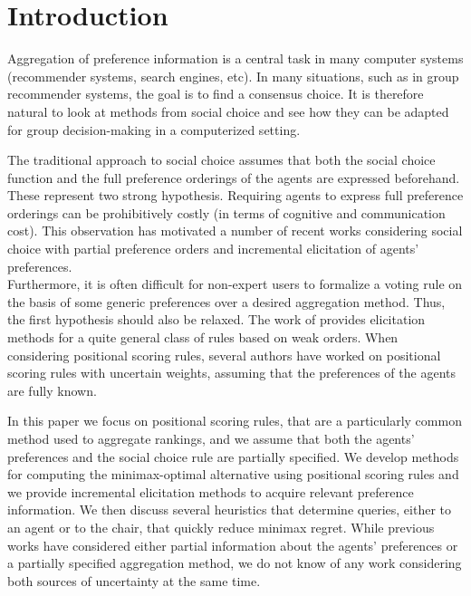 \section{Introduction}
Aggregation of preference information is a central task in many computer systems (recommender systems, search engines, etc).
In many situations, such as in group recommender systems, the goal is to find a consensus choice.
It is therefore natural to look at methods from social choice and see how they can be adapted for group decision-making in a computerized setting.

The traditional approach to social choice assumes that both the social choice function and the full preference orderings of the agents are expressed beforehand. These represent two strong hypothesis.
Requiring agents to express full preference orderings can be prohibitively costly (in terms of cognitive and communication cost).
This observation has motivated a number of recent works considering social choice with partial preference orders \citep{Xia2008, Pini2009, Konczak05} and incremental elicitation \citep{Kalech2011, Lu2011, Naamani-Dery2015} of agents’ preferences. \\ Furthermore, it is often difficult for non-expert users to formalize a voting rule on the basis of some generic preferences over a desired aggregation method. Thus, the first hypothesis should also be relaxed. 
The work of \citet{Cailloux2014} provides elicitation methods for a quite general class of rules based on weak orders.
When considering positional scoring rules, several authors \citep{Stein1994, Llamazares2013, Viappiani2018} have worked on positional scoring rules with uncertain weights, assuming that the preferences of the agents are fully known.

In this paper we focus on positional scoring rules, that are a particularly common method used to aggregate rankings, and we assume that both the agents’ preferences and the social choice rule are partially specified. We develop methods for computing the minimax-optimal
alternative using positional scoring rules and we provide incremental elicitation methods to acquire relevant preference information. We then discuss several heuristics that determine queries, either to an agent or to the chair, that quickly reduce minimax regret. While previous works have considered either partial information about the agents’
preferences or a partially specified aggregation method, we do not know of any work considering both sources of uncertainty at the same time.

